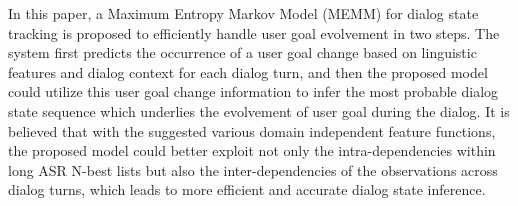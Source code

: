 In this paper, a Maximum Entropy Markov Model (MEMM) for dialog state tracking is proposed to efficiently handle user goal evolvement in two steps. The system
 first predicts the occurrence of a user goal change based on linguistic
 features and dialog context for each dialog turn, and then the proposed model
 could utilize this user goal change information to infer the most probable
 dialog state sequence which underlies the evolvement of user goal during the
 dialog. It is believed that with the suggested various domain independent
 feature functions, the proposed model could better exploit not only the
 intra-dependencies within long ASR N-best lists but also the inter-dependencies
 of the observations across dialog turns, which leads to more efficient and
 accurate dialog state inference.

